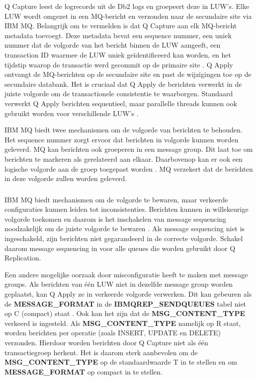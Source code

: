 Q Capture leest de logrecords uit de Db2 logs en groepeert deze in LUW's.
Elke LUW wordt omgezet in een MQ-bericht en verzonden naar de secundaire site via IBM MQ.
Belangrijk om te vermelden is dat Q Capture aan elk MQ-bericht metadata toevoegt.
Deze metadata bevat een sequence nummer, een uniek nummer dat de volgorde van het bericht binnen de LUW aangeeft, een transaction ID waarmee de LUW uniek geïdentificeerd kan worden, en het tijdstip waarop de transactie werd gecommit op de primaire site \autocite{ibm_2025_structure_delimited_messages_event_publishing}.
Q Apply ontvangt de MQ-berichten op de secundaire site en past de wijzigingen toe op de secundaire databank.
Het is cruciaal dat Q Apply de berichten verwerkt in de juiste volgorde om de transactionele consistentie te waarborgen.
Standaard verwerkt Q Apply berichten sequentieel, maar parallelle threads kunnen ook gebruikt worden voor verschillende LUW's \autocite{ibm_2026_q_apply_program}.

IBM MQ biedt twee mechanismen om de volgorde van berichten te behouden.
Het sequence nummer zorgt ervoor dat berichten in volgorde kunnen worden geleverd.
MQ kan berichten ook groeperen in een message group.
Dit laat toe om berichten te markeren als gerelateerd aan elkaar.
Daarbovenop kan er ook een logische volgorde aan de groep toegepast worden \autocite{ibm_2026_message_group}.
MQ verzekert dat de berichten in deze volgorde zullen worden geleverd.

\subsubsection{}
\label{sec:asynchrone-log-replicatie-oorzaken-inconsistenties-volgorde}

IBM MQ biedt mechanismen om de volgorde te bewaren, maar verkeerde configuraties kunnen leiden tot inconsistenties.
Berichten kunnen in willekeurige volgorde toekomen en daarom is het inschakelen van message sequencing noodzakelijk om de juiste volgorde te bewaren \autocite{ibm_2025_message_sequencing}.
Als message sequencing niet is ingeschakeld, zijn berichten niet gegarandeerd in de correcte volgorde.
Schakel daarom message sequencing in voor alle queues die worden gebruikt door Q Replication.

Een andere mogelijke oorzaak door misconfiguratie heeft te maken met message groups.
Als berichten van één LUW niet in dezelfde message group worden geplaatst, kan Q Apply ze in verkeerde volgorde verwerken.
Dit kan gebeuren als de \textbf{MESSAGE\_FORMAT} in de \textbf{IBMQREP\_SENDQUEUES} tabel niet op C (compact) staat \autocite{ibm_2026_ibmqrep_sendqueues}.
Ook kan het zijn dat de \textbf{MSG\_CONTENT\_TYPE} verkeerd is ingesteld.
Als \textbf{MSG\_CONTENT\_TYPE} namelijk op R staat, worden berichten per operatie (zoals INSERT, UPDATE en DELETE) verzonden.
Hierdoor worden berichten door Q Capture niet als één transactiegroep herkent.
Het is daarom sterk aanbevolen om de \textbf{MSG\_CONTENT\_TYPE} op de standaardwaarde T in te stellen en om \textbf{MESSAGE\_FORMAT} op compact in te stellen.

